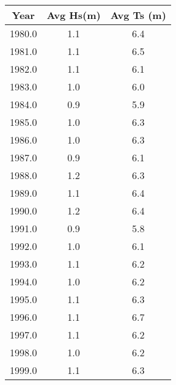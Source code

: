 \begin{tabular}{ccc}
Year & Avg Hs(m) & Avg Ts (m)\\ \hline
1980.0 & 1.1 & 6.4 \\
1981.0 & 1.1 & 6.5 \\
1982.0 & 1.1 & 6.1 \\
1983.0 & 1.0 & 6.0 \\
1984.0 & 0.9 & 5.9 \\
1985.0 & 1.0 & 6.3 \\
1986.0 & 1.0 & 6.3 \\
1987.0 & 0.9 & 6.1 \\
1988.0 & 1.2 & 6.3 \\
1989.0 & 1.1 & 6.4 \\
1990.0 & 1.2 & 6.4 \\
1991.0 & 0.9 & 5.8 \\
1992.0 & 1.0 & 6.1 \\
1993.0 & 1.1 & 6.2 \\
1994.0 & 1.0 & 6.2 \\
1995.0 & 1.1 & 6.3 \\
1996.0 & 1.1 & 6.7 \\
1997.0 & 1.1 & 6.2 \\
1998.0 & 1.0 & 6.2 \\
1999.0 & 1.1 & 6.3 \\
\hline
\end{tabular}
